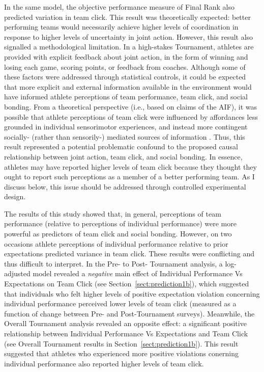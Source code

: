 \begin{CJK}{UTF8}{gbsn}
In the same model, the objective performance measure of Final Rank also predicted variation in team click.  This result was theoretically expected: better performing teams would necessarily achieve higher levels of coordination in response to higher levels of uncertainty in joint action.  However, this result also signalled a methodological limitation.  In a high-stakes Tournament, athletes are provided with explicit feedback about joint action, in the form of winning and losing each game, scoring points, or feedback from coaches.   Although some of these factors were addressed through statistical controls, it could be expected that more explicit and external information available in the environment would have informed athlete perceptions of team performance, team click, and social bonding. From a theoretical perspective (i.e., based on claims of the AIF), it was possible that athlete perceptions of team click were influenced by affordances less grounded in individual sensorimotor experiences, and instead more contingent socially- (rather than sensorily-) mediated sources of information \citep{Ramstead2016}.  Thus, this result represented a potential problematic confound to the proposed causal relationship between joint action, team click, and social bonding.  In essence, athletes may have reported higher levels of team click because they thought they ought to report such perceptions as a member of a better performing team. As I discuss below, this issue should be addressed through controlled experimental design.

The results of this study showed that, in general, perceptions of team performance (relative to perceptions of individual performance) were more powerful as predictors of team click and social bonding.  However, on two occasions athlete perceptions of individual performance relative to prior expectations predicted variance in team click. These results were conflicting and thus difficult to interpret.  In the Pre- to Post- Tournament analysis, a log-adjusted model revealed a \textit{negative} main effect of Individual Performance Vs Expectations on Team Click (see Section~\ref{sect:prediction1b}), which suggested that individuals who felt higher levels of positive expectation violation concerning individual performance perceived lower levels of team click (measured as a function of change between Pre- and Post-Tournament surveys).  Meanwhile, the Overall Tournament analysis revealed an opposite effect: a significant positive relationship between Individual Performance Vs Expectations and Team Click (see Overall Tournament results in Section~\ref{sect:prediction1b}). This result suggested that athletes who experienced more positive violations conerning individual performance also reported higher levels of team click.


\end{CJK}
